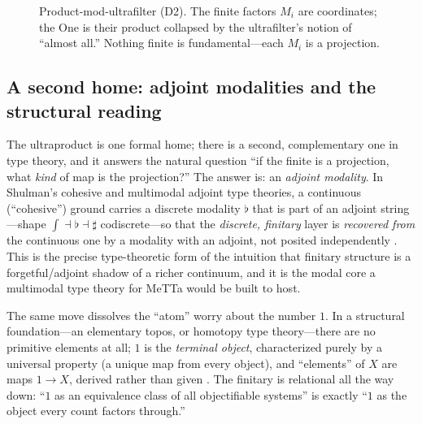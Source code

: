 \documentclass[]{article}
\theoremstyle{definition}
\theoremstyle{remark}
\newcommand{\Uf}{\mathcal{U}}
\DeclareMathOperator{\uprod}{\textstyle\prod}
\begin{document}
\begin{figure}[H]
\centering
{}
\caption{Product-mod-ultrafilter (D2). The finite factors $M_i$ are coordinates;
the One is their product collapsed by the ultrafilter's notion of ``almost all.''
Nothing finite is fundamental---each $M_i$ is a projection.}
\label{fig:prod}
\end{figure}

\subsection{A second home: adjoint modalities and the structural reading}
\label{sec:adjoint}

The ultraproduct is one formal home; there is a second, complementary one in
type theory, and it answers the natural question ``if the finite is a projection,
what \emph{kind} of map is the projection?'' The answer is: an \emph{adjoint
modality}. In Shulman's cohesive and multimodal adjoint type theories, a continuous
(``cohesive'') ground carries a discrete modality $\flat$ that is part of an
adjoint string---shape $\int\dashv\flat\dashv\sharp$ codiscrete---so that the
\emph{discrete, finitary} layer is \emph{recovered from} the continuous one by a
modality with an adjoint, not posited independently
\cite{Shulman2018Cohesive, GratzerMTT2020, ShulmanMATT2023}. This is the precise
type-theoretic form of the intuition that finitary structure is a forgetful/adjoint
shadow of a richer continuum, and it is the modal core a
multimodal type theory for MeTTa would be built to host.

The same move dissolves the ``atom'' worry about the number $1$. In a structural
foundation---an elementary topos, or homotopy type theory---there are no primitive
elements at all; $1$ is the \emph{terminal object}, characterized purely by a
universal property (a unique map from every object), and ``elements'' of $X$ are
maps $1\to X$, derived rather than given \cite{MacLaneMoerdijk1992, HoTTBook}. The
finitary is relational all the way down: ``$1$ as an equivalence class of all
objectifiable systems'' is exactly ``$1$ as the object every count factors
through.''
\end{document}

